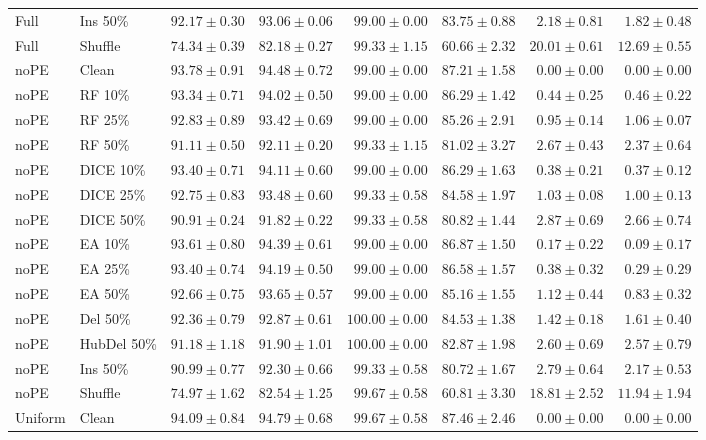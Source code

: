 {\begin{longtable}{llrrrrrr}
Full & Ins 50\% & $92.17\pm0.30$ & $93.06\pm0.06$ & $99.00\pm0.00$ & $83.75\pm0.88$ & $2.18\pm0.81$ & $1.82\pm0.48$ \\
Full & Shuffle & $74.34\pm0.39$ & $82.18\pm0.27$ & $99.33\pm1.15$ & $60.66\pm2.32$ & $20.01\pm0.61$ & $12.69\pm0.55$ \\
noPE & Clean & $93.78\pm0.91$ & $94.48\pm0.72$ & $99.00\pm0.00$ & $87.21\pm1.58$ & $0.00\pm0.00$ & $0.00\pm0.00$ \\
noPE & RF 10\% & $93.34\pm0.71$ & $94.02\pm0.50$ & $99.00\pm0.00$ & $86.29\pm1.42$ & $0.44\pm0.25$ & $0.46\pm0.22$ \\
noPE & RF 25\% & $92.83\pm0.89$ & $93.42\pm0.69$ & $99.00\pm0.00$ & $85.26\pm2.91$ & $0.95\pm0.14$ & $1.06\pm0.07$ \\
noPE & RF 50\% & $91.11\pm0.50$ & $92.11\pm0.20$ & $99.33\pm1.15$ & $81.02\pm3.27$ & $2.67\pm0.43$ & $2.37\pm0.64$ \\
noPE & DICE 10\% & $93.40\pm0.71$ & $94.11\pm0.60$ & $99.00\pm0.00$ & $86.29\pm1.63$ & $0.38\pm0.21$ & $0.37\pm0.12$ \\
noPE & DICE 25\% & $92.75\pm0.83$ & $93.48\pm0.60$ & $99.33\pm0.58$ & $84.58\pm1.97$ & $1.03\pm0.08$ & $1.00\pm0.13$ \\
noPE & DICE 50\% & $90.91\pm0.24$ & $91.82\pm0.22$ & $99.33\pm0.58$ & $80.82\pm1.44$ & $2.87\pm0.69$ & $2.66\pm0.74$ \\
noPE & EA 10\% & $93.61\pm0.80$ & $94.39\pm0.61$ & $99.00\pm0.00$ & $86.87\pm1.50$ & $0.17\pm0.22$ & $0.09\pm0.17$ \\
noPE & EA 25\% & $93.40\pm0.74$ & $94.19\pm0.50$ & $99.00\pm0.00$ & $86.58\pm1.57$ & $0.38\pm0.32$ & $0.29\pm0.29$ \\
noPE & EA 50\% & $92.66\pm0.75$ & $93.65\pm0.57$ & $99.00\pm0.00$ & $85.16\pm1.55$ & $1.12\pm0.44$ & $0.83\pm0.32$ \\
noPE & Del 50\% & $92.36\pm0.79$ & $92.87\pm0.61$ & $100.00\pm0.00$ & $84.53\pm1.38$ & $1.42\pm0.18$ & $1.61\pm0.40$ \\
noPE & HubDel 50\% & $91.18\pm1.18$ & $91.90\pm1.01$ & $100.00\pm0.00$ & $82.87\pm1.98$ & $2.60\pm0.69$ & $2.57\pm0.79$ \\
noPE & Ins 50\% & $90.99\pm0.77$ & $92.30\pm0.66$ & $99.33\pm0.58$ & $80.72\pm1.67$ & $2.79\pm0.64$ & $2.17\pm0.53$ \\
noPE & Shuffle & $74.97\pm1.62$ & $82.54\pm1.25$ & $99.67\pm0.58$ & $60.81\pm3.30$ & $18.81\pm2.52$ & $11.94\pm1.94$ \\
Uniform & Clean & $94.09\pm0.84$ & $94.79\pm0.68$ & $99.67\pm0.58$ & $87.46\pm2.46$ & $0.00\pm0.00$ & $0.00\pm0.00$ \\

\end{longtable}}
